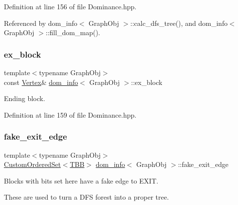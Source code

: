 Definition at line 156 of file Dominance.\+hpp.



Referenced by dom\+\_\+info$<$ Graph\+Obj $>$\+::calc\+\_\+dfs\+\_\+tree(), and dom\+\_\+info$<$ Graph\+Obj $>$\+::fill\+\_\+dom\+\_\+map().

\mbox{\label{classdom__info_aa625c50f21a56328df0b820f201a4b51}} 
\subsubsection{\texorpdfstring{ex\+\_\+block}{ex\_block}}
{\footnotesize\ttfamily template$<$typename Graph\+Obj$>$ \\
const \hyperlink{classdom__info_a5e4ca21e2c5281bdbb95d2c8d965c9be}{Vertex}\& \hyperlink{classdom__info}{dom\+\_\+info}$<$ Graph\+Obj $>$\+::ex\+\_\+block\hspace{0.3cm}{\ttfamily [private]}}



Ending block. 



Definition at line 159 of file Dominance.\+hpp.

\mbox{\label{classdom__info_aa69999b48cf442d6bb20d295795e403c}} 
\subsubsection{\texorpdfstring{fake\+\_\+exit\+\_\+edge}{fake\_exit\_edge}}
{\footnotesize\ttfamily template$<$typename Graph\+Obj$>$ \\
\hyperlink{classCustomOrderedSet}{Custom\+Ordered\+Set}$<$\hyperlink{Dominance_8hpp_ac35ffd4ddeccae8225d6ec6f55d65a97}{T\+BB}$>$ \hyperlink{classdom__info}{dom\+\_\+info}$<$ Graph\+Obj $>$\+::fake\+\_\+exit\+\_\+edge\hspace{0.3cm}{\ttfamily [private]}}



Blocks with bits set here have a fake edge to E\+X\+IT. 

These are used to turn a D\+FS forest into a proper tree. 

